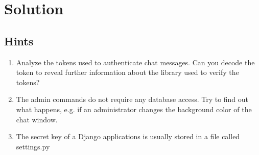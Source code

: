 \documentclass[12pt,a4paper]{article}
\begin{document}
\begin{comment}

 This command is then executed by making use of Python's subprocess module \footnote{\url{https://docs.python.org/2/library/subprocess.html}} with the privileges of the Django application.
 
 \paragraph{Vulnerability:}
 The vulnerability arises from two inattentions:
\begin{enumerate}
\item \textbf{Insufficient user input validation:} The only restriction on the user's first name is the length of 64 characters. Appart from that any string is allowed.
\item \textbf{shell=True:} Setting shell=True in Python's subprocess module makes the command beeing executed through the shell, allowing any useage of shell supported features such as command substitution. 
\end{enumerate}

\paragraph{Impact:} As a result of the vulnerability the user can execute any shell command which has the privileges of the Flask application (caweb user). This includes access to the application's settings (such as secret key) and also the possibility to act as the CA which means having all the functionality of the CA (e.g. issuing/revoking certificates) as well as access to the users' and in the intermediate CA's private keys.
 
 The admin commands are parsed by the web framework and then executed with a bash command in a subprocess, without sanitizing the input first. The bash commands have direct access to the local file system and allow an attacker to perform a bash injection.
\end{comment}

\section{Solution}

\subsection{Hints}
\begin{enumerate}
	\item Analyze the tokens used to authenticate chat messages. Can you decode the token to reveal further information about the library used to verify the tokens?
	\item The admin commands do not require any database access. Try to find out what happens, e.g. if an administrator changes the background color of the chat window.
	\item The secret key of a Django applications is usually stored in a file called settings.py
\end{enumerate}
\end{document}
